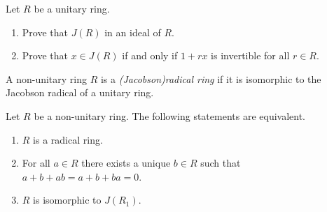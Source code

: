    \begin{exercise}\label{ex:Jideal}
       Let $R$ be a unitary ring. 
       \begin{enumerate}
           \item Prove that $J(R)$ in an ideal of $R$.
           \item Prove that  $x\in J(R)$ if and only if $1 + rx$ is invertible for all $r\in R$.
       \end{enumerate}
   \end{exercise}

   \begin{definition}
       A non-unitary ring $R$ is a  \emph{(Jacobson)radical ring} if it is isomorphic
        to the Jacobson radical of a unitary ring. 
   \end{definition}

    \begin{proposition}
        Let $R$ be a non-unitary ring. The following statements are equivalent.
    \begin{enumerate}
        \item $R$ is a radical ring.
        \item For all $a\in R$ there exists a unique $b\in R$ such that $a+b+ab=a+b+ba= 0$.
        \item $R$ is isomorphic to $J(R_1)$.
    \end{enumerate}
    \end{proposition}


